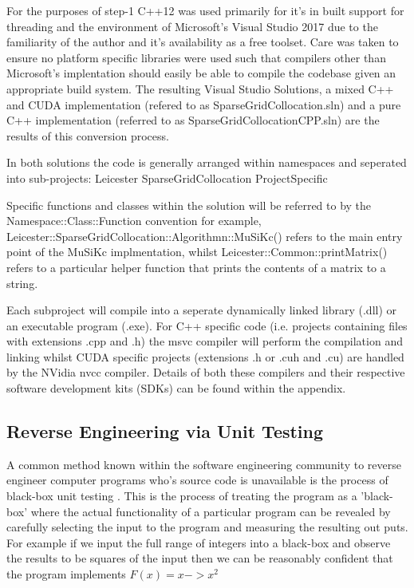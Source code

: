 \documentclass[a4paper]{amsart}
\begin{document}
For the purposes of step-1 C++12 was used primarily for it's in built support for threading and the environment of Microsoft's Visual Studio 2017 due to the familiarity of the author and it's availability as a free toolset. Care was taken to ensure no platform specific libraries were used such that compilers other than Microsoft's implentation should easily be able to compile the codebase given an appropriate build system. The resulting Visual Studio Solutions, a mixed C++ and CUDA implementation (refered to as SparseGridCollocation.sln) and a pure C++ implementation (referred to as SparseGridCollocationCPP.sln) are the results of this conversion process.

In both solutions the code is generally arranged within namespaces and seperated into sub-projects:
Leicester
	SparseGridCollocation
		ProjectSpecific

Specific functions and classes within the solution will be referred to by the Namespace::Class::Function convention for example, Leicester::SparseGridCollocation::Algorithmn::MuSiKc() refers to the main entry point of the MuSiKc implmentation, whilst Leicester::Common::printMatrix() refers to a particular helper function that prints the contents of a matrix to a string.

Each subproject will compile into a seperate dynamically linked library (.dll) or an executable program (.exe). For C++ specific code (i.e. projects containing files with extensions .cpp and .h) the msvc compiler will perform the compilation and linking whilst CUDA specific projects (extensions .h or .cuh and .cu) are handled by the NVidia nvcc compiler. Details of both these compilers and their respective software development kits (SDKs) can be found within the appendix.

\subsection{Reverse Engineering via Unit Testing}
A common method known within the software engineering community to reverse engineer computer programs who's source code is unavailable is the process of black-box unit testing \cite{unit testing}. This is the process of treating the program as a 'black-box' where the actual functionality of a particular program can be revealed by carefully selecting the input to the program and measuring the resulting out puts. For example if we input the full range of integers into a black-box and observe the results to be squares of the input then we can be reasonably confident that the program implements $F(x) = x -> x^{2}$
\end{document}
